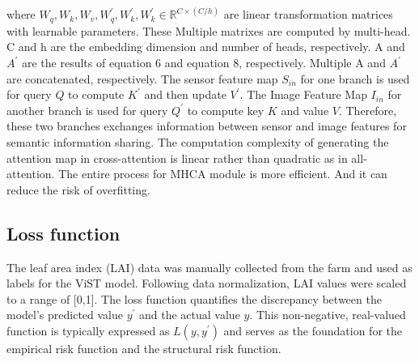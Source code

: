 \documentclass[acmsmall, screen]{acmart}
\begin{document}
where  \begin{math}
  W_q,W_k,W_v,W_q^\prime, W_k^\prime, W_k^\prime \in \mathbb{R}^{C\times\left(C/h\right)}
\end{math} are linear transformation matrices with learnable parameters. These Multiple matrixes are computed by multi-head.  C and h are the embedding dimension and number of heads, respectively. A and \begin{math}
  A^\prime
\end{math} are the results of equation 6 and equation 8, respectively. Multiple A and \begin{math}
  A^\prime
\end{math} are concatenated, respectively. The sensor feature map \begin{math}
  S_{in}
\end{math} for one branch is used for query \begin{math}
  Q
\end{math} to compute \begin{math}
  K^\prime
\end{math} and then update \begin{math}
  V^\prime
\end{math}. The Image Feature Map \begin{math}
  I_{in}
\end{math} for another branch is used for query \begin{math}
  Q^\prime
\end{math} to compute key \begin{math}
  K
\end{math} and value \begin{math}
  V
\end{math}. Therefore, these two branches exchanges information between sensor and image features for semantic information sharing. The computation complexity of generating the attention map in cross-attention is linear rather than quadratic as in all-attention. The entire process for MHCA module is more efficient. And it can reduce the risk of overfitting.


\subsection{Loss function}
The leaf area index (LAI) data was manually collected from the farm and used as labels for the ViST model. Following data normalization, LAI values were scaled to a range of [0,1]. The loss function quantifies the discrepancy between the model's predicted value \begin{math}
  y^\prime
\end{math} and the actual value \begin{math}
  y
\end{math}. This non-negative, real-valued function is typically expressed as \begin{math}
  L(y, y^\prime)
\end{math} and serves as the foundation for the empirical risk function and the structural risk function.
\end{document}

